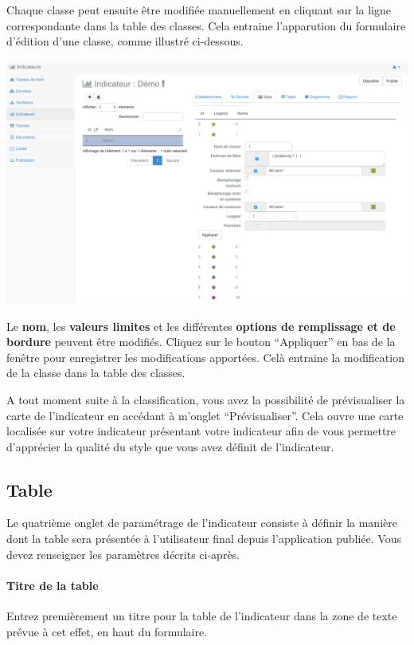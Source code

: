 \documentclass[letterpaper,10pt,french]{sphinxmanual}
\begin{document}
Chaque classe peut ensuite être modifiée manuellement en cliquant sur
la ligne correspondante dans la table des classes. Cela entraine
l'apparution du formulaire d'édition d'une classe, comme illustré
ci-dessous.

\includegraphics[width=1.000\linewidth]{indicator-classes.png}

Le \textbf{nom}, les \textbf{valeurs limites} et les différentes \textbf{options de remplissage et de bordure} peuvent être modifiés. Cliquez sur le bouton ``Appliquer'' en bas de la fenêtre pour enregistrer les modifications apportées. Celà entraine la modification de la classe dans la table des classes.

A tout moment suite à la classification, vous avez la possibilité de
prévisualiser la carte de l'indicateur en accédant à m'onglet
``Prévisualiser''. Cela ouvre une carte localisée sur votre indicateur
présentant votre indicateur afin de vous permettre d'apprécier la
qualité du style que vous avez définit de l'indicateur.


\subsection{Table}
\label{indicators/indicatorspanel:id1}
Le quatrième onglet de paramétrage de l'indicateur consiste à définir
la manière dont la table sera présentée à l'utilisateur final depuis
l'application publiée. Vous devez renseigner les paramètres décrits
ci-après.
\paragraph{Titre de la table}

Entrez premièrement un titre pour la table de l'indicateur dans la zone de texte prévue à cet effet, en haut du formulaire.
\end{document}
